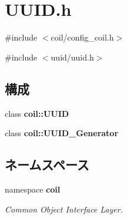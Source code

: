 \section{UUID.h}
\label{UUID_8h}
{\ttfamily \#include $<$coil/config\_\-coil.h$>$}\par
{\ttfamily \#include $<$uuid/uuid.h$>$}\par
\subsection*{構成}
\begin{DoxyCompactItemize}
\item 
class {\bf coil::UUID}
\item 
class {\bf coil::UUID\_\-Generator}
\end{DoxyCompactItemize}
\subsection*{ネームスペース}
\begin{DoxyCompactItemize}
\item 
namespace {\bf coil}


\begin{DoxyCompactList}\small\item\em Common Object Interface Layer. \item\end{DoxyCompactList}

\end{DoxyCompactItemize}
